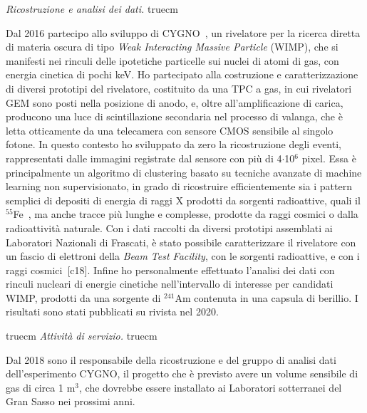 \documentclass[11pt,twoside,a4paper]{article}
\begin{document}
\textit{Ricostruzione e analisi dei dati.}
 truecm

Dal 2016 partecipo allo sviluppo di CYGNO~\cite{Pinci:2019ztr}, un
rivelatore per la ricerca diretta di materia oscura di tipo
\textit{Weak Interacting Massive Particle} (WIMP), che si manifesti
nei rinculi delle ipotetiche particelle sui nuclei di atomi di gas,
con energia cinetica di pochi keV. Ho partecipato alla costruzione e
caratterizzazione di diversi prototipi del rivelatore, costituito da
una TPC a gas, in cui rivelatori GEM sono posti nella posizione di
anodo, e, oltre all'amplificazione di carica, producono una luce di
scintillazione secondaria nel processo di valanga, che \`e letta
otticamente da una telecamera con sensore CMOS sensibile al singolo
fotone.  In questo contesto ho sviluppato da zero la ricostruzione
degli eventi, rappresentati dalle immagini registrate dal sensore con
pi\`u di 4$\cdot$10$^6$ pixel.  Essa \`e principalmente un algoritmo
di clustering basato su tecniche avanzate di machine learning non
supervisionato, in grado di ricostruire efficientemente sia i pattern
semplici di depositi di energia di raggi X prodotti da sorgenti
radioattive, quali il $^{55}$Fe~\cite{Costa_2019}, ma anche tracce
pi\`u lunghe e complesse, prodotte da raggi cosmici o dalla
radioattivit\`a naturale.  Con i dati raccolti da diversi prototipi
assemblati ai Laboratori Nazionali di Frascati, \`e stato possibile
caratterizzare il rivelatore con un fascio di elettroni della
\textit{Beam Test Facility}, con le sorgenti radioattive, e con i
raggi cosmici~[c18]. Infine ho personalmente effettuato l'analisi dei
dati con rinculi nucleari di energie cinetiche nell'intervallo di
interesse per candidati WIMP, prodotti da una sorgente di $^{241}$Am
contenuta in una capsula di berillio. I risultati sono stati
pubblicati su rivista nel 2020.

 truecm
\textit{Attivit\`a di servizio.}
 truecm

Dal 2018 sono il responsabile della ricostruzione e del gruppo di
analisi dati dell'esperimento CYGNO, il progetto che \`e previsto
avere un volume sensibile di gas di circa 1 m$^3$, che dovrebbe essere
installato ai Laboratori sotterranei del Gran Sasso nei prossimi anni.

\clearpage

\nocite{*}


\end{document}
